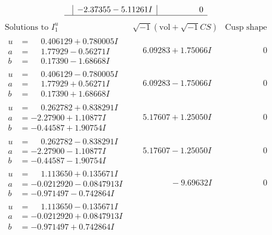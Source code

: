 \documentclass[1p]{elsarticle_modified}
\theoremstyle{definition}
\newcommand{\I}{\sqrt{-1}}
\begin{document}
$$\begin{array}{c|c|c}
 & -2.37355 - 5.11261 I & \phantom{-0.000000 } 0\\
 \hline 
 \end{array}$$\newpage$$\begin{array}{c|c|c}  
\text{Solutions to }I^u_{1}& \I (\text{vol} + \sqrt{-1}CS) & \text{Cusp shape}\\
 \hline 
\begin{aligned}
u &= \phantom{-}0.406129 + 0.780005 I \\
a &= \phantom{-}1.77929 - 0.56271 I \\
b &= \phantom{-}0.17390 - 1.68668 I\end{aligned}
 & \phantom{-}6.09283 + 1.75066 I & \phantom{-0.000000 } 0 \\ \hline\begin{aligned}
u &= \phantom{-}0.406129 - 0.780005 I \\
a &= \phantom{-}1.77929 + 0.56271 I \\
b &= \phantom{-}0.17390 + 1.68668 I\end{aligned}
 & \phantom{-}6.09283 - 1.75066 I & \phantom{-0.000000 } 0 \\ \hline\begin{aligned}
u &= \phantom{-}0.262782 + 0.838291 I \\
a &= -2.27900 + 1.10877 I \\
b &= -0.44587 + 1.90754 I\end{aligned}
 & \phantom{-}5.17607 + 1.25050 I & \phantom{-0.000000 } 0 \\ \hline\begin{aligned}
u &= \phantom{-}0.262782 - 0.838291 I \\
a &= -2.27900 - 1.10877 I \\
b &= -0.44587 - 1.90754 I\end{aligned}
 & \phantom{-}5.17607 - 1.25050 I & \phantom{-0.000000 } 0 \\ \hline\begin{aligned}
u &= \phantom{-}1.113650 + 0.135671 I \\
a &= -0.0212920 - 0.0847913 I \\
b &= -0.971497 - 0.742864 I\end{aligned}
 & \phantom{-0.000000 } -9.69632 I & \phantom{-0.000000 } 0 \\ \hline\begin{aligned}
u &= \phantom{-}1.113650 - 0.135671 I \\
a &= -0.0212920 + 0.0847913 I \\
b &= -0.971497 + 0.742864 I\end{aligned}

\end{array}$$
\end{document}
